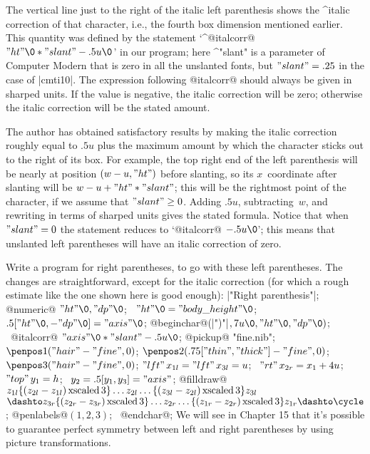{{{{\danger The vertical line just to the right of the italic left parenthesis
shows the ^{italic correction} of that character, i.e., the fourth box
dimension mentioned earlier. This quantity was defined by the statement
`^@italcorr@ $"ht"\0\ast"slant"-.5u\0$' in our program; here ^"slant" is
a parameter of Computer Modern that is zero in all the unslanted fonts,
but $"slant"=.25$ in the case of |cmti10|. The expression following
@italcorr@ should always be given in sharped units. If the value is
negative, the italic correction will be zero; otherwise the italic
correction will be the stated amount.

\danger The author has obtained satisfactory results by making the italic
correction roughly equal to $.5u$ plus the maximum amount by which the
character sticks out to the right of its box. For example, the top right
end of the left parenthesis will be nearly at position $(w-u,"ht")$ before
slanting, so its $x$~coordinate after slanting will be $w-u+"ht"\ast"slant"$;
this will be the rightmost point of the
character, if we assume that $"slant"\ge0$. Adding $.5u$, subtracting~$w$,
and rewriting in terms of sharped units gives the stated formula. Notice
that when $"slant"=0$ the statement reduces to `@italcorr@ $-.5u\0$';
this means that unslanted left parentheses will have an italic correction
of zero.

\dangerexercise Write a program for right parentheses, to go with these
left parentheses.
\answer The changes are straightforward, except for the italic correction
(for which a rough estimate like the one shown here is good enough):
\def\xs(#1,#2){\{(z_{#1}-z_{#2})\,{\rm xscaled}\,3\}}%
\begindisplay
|"Right parenthesis"|;\cr
@numeric@ $"ht"\0,"dp"\0$; \
 $"ht"\0="body\_height"\0$; \
 $.5["ht"\0,-"dp"\0]="axis"\0$;\cr
@beginchar@\kern1pt(|")"|$,7u\0,"ht"\0,"dp"\0)$;
 \ @italcorr@ $"axis"\0\ast"slant"-.5u\0$;\cr
@pickup@ "fine.nib"; \ $\penpos1("hair"-"fine",0)$;\cr
$\penpos2(.75["thin","thick"]-"fine",0)$; \ $\penpos3("hair"-"fine",0)$;\cr
$\mathop{"lft"}x_{1l}=\mathop{"lft"}x_{3l}=u$; \
 $\mathop{"rt"}x_{2r}=x_1+4u$; \
$\mathop{"top"}y_1=h$; \
 $y_2=.5[y_1,y_3]="axis"$;\cr
@filldraw@ $z_{1l}\xs(2l,1l)\ldots z_{2l}\ldots\xs(3l,2l)z_{3l}$\cr
\qquad$\dashto z_{3r}\xs(2r,3r)
 \ldots z_{2r}\ldots\xs(1r,2r)z_{1r}\dashto\cycle$;\cr
@penlabels@$(1,2,3)$; \ @endchar@;\cr
\enddisplay
We will see in Chapter 15 that it's possible to guarantee perfect symmetry
between left and right parentheses by using picture transformations.

}}}}
